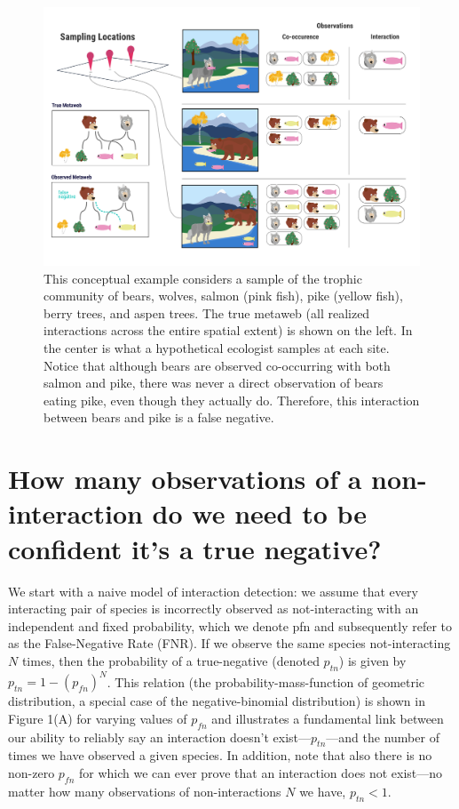 \documentclass[10pt,oneside]{article}
\makeatletter
\def\maxwidth{\ifdim\Gin@nat@width>\linewidth\linewidth
\else\Gin@nat@width\fi}
\let\Oldincludegraphics\includegraphics
\renewcommand{\includegraphics}[1]{\Oldincludegraphics[width=\maxwidth]{#1}}
\makeatother
\begin{document}
\begin{figure}
\hypertarget{fig:concept}{%
\centering
\includegraphics{./figures/concept.png}
\caption{This conceptual example considers a sample of the trophic
community of bears, wolves, salmon (pink fish), pike (yellow fish),
berry trees, and aspen trees. The true metaweb (all realized
interactions across the entire spatial extent) is shown on the left. In
the center is what a hypothetical ecologist samples at each site. Notice
that although bears are observed co-occurring with both salmon and pike,
there was never a direct observation of bears eating pike, even though
they actually do. Therefore, this interaction between bears and pike is
a false negative.}\label{fig:concept}
}
\end{figure}

\hypertarget{how-many-observations-of-a-non-interaction-do-we-need-to-be-confident-its-a-true-negative}{%
\section{How many observations of a non-interaction do we need to be
confident it's a true
negative?}\label{how-many-observations-of-a-non-interaction-do-we-need-to-be-confident-its-a-true-negative}}

We start with a naive model of interaction detection: we assume that
every interacting pair of species is incorrectly observed as
not-interacting with an independent and fixed probability, which we
denote pfn and subsequently refer to as the False-Negative Rate (FNR).
If we observe the same species not-interacting \(N\) times, then the
probability of a true-negative (denoted \(p_{tn}\)) is given by
\(p_{tn}=1-(p_{fn})^N\). This relation (the probability-mass-function of
geometric distribution, a special case of the negative-binomial
distribution) is shown in Figure 1(A) for varying values of \(p_{fn}\)
and illustrates a fundamental link between our ability to reliably say
an interaction doesn't exist---\(p_{tn}\)---and the number of times we
have observed a given species. In addition, note that also there is no
non-zero \(p_{fn}\) for which we can ever prove that an interaction does
not exist---no matter how many observations of non-interactions \(N\) we
have, \(p_{tn}<1\).
\end{document}
